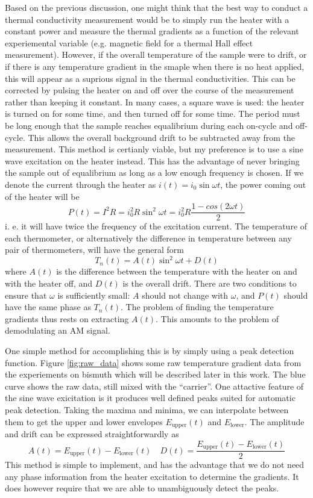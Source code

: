 \documentclass{thesis-umich}
\begin{document}
Based on the previous discussion, one might think that the best way to conduct a thermal conductivity measurement would be to simply run the heater with a constant power and measure the thermal gradients as a function of the relevant experiemental variable (e.g. magnetic field for a thermal Hall effect measurement). However, if the overall temperature of the sample were to drift, or if there is any temperature gradient in the smaple when there is no heat applied, this will appear as a suprious signal in the thermal conductivities. This can be corrected by pulsing the heater on and off over the course of the measurement rather than keeping it constant. In many cases, a square wave is used: the heater is turned on for some time, and then turned off for some time. The period must be long enough that the sample reaches equalibrium during each on-cycle and off-cycle. This allows the overall background drift to be subtracted away from the measurement. This method is certianly viable, but my preference is to use a sine wave excitation on the heater instead. This has the advantage of never bringing the sample out of equalibrium as long as a low enough frequency is chosen. If we denote the current through the heater as $i(t) = i_0 \sin \omega t$, the power coming out of the heater will be
\[P(t) = I^2R = i_0^2R \sin^2 \omega t = i_0^2 R \frac{1 - cos(2\omega t)}{2} \]
i. e. it will have twice the frequency of the excitation current. The temperature of each thermometer, or alternatively the difference in temperature between any pair of thermometers, will have the general form
\[ T_n(t) = A(t)\sin^2 \omega t + D(t) \]
where $A(t)$ is the difference between the temperature with the heater on and with the heater off, and $D(t)$ is the overall drift. There are two conditions to ensure that $\omega$ is sufficiently small: $A$ should not change with $\omega$, and $P(t)$ should have the same phase as $T_n(t)$. The problem of finding the temperature gradients thus rests on extracting $A(t)$. This amounts to the problem of demodulating an AM signal.

One simple method for accomplishing this is by simply using a peak detection function. Figure \ref{fig:raw_data} shows some raw temperature gradient data from the experiements on bismuth which will be described later in this work. The blue curve shows the raw data, still mixed with the ``carrier''. One attactive feature of the sine wave exicitation is it produces well defined peaks suited for automatic peak detection. Taking the maxima and minima, we can interpolate between them to get the upper and lower envelopes $E_{\mathrm{upper}}(t)$ and $E_{\mathrm{lower}}$. The amplitude and drift can be expressed straightforwardly as
\[ A(t) = E_{\mathrm{upper}}(t) - E_{\mathrm{lower}}(t) \quad D(t) = \frac{E_{\mathrm{upper}}(t) - E_{\mathrm{lower}}(t)}{2} \]
This method is simple to implement, and has the advantage that we do not need any phase information from the heater excitation to determine the gradients. It does however require that we are able to unambiguously detect the peaks.
\end{document}
